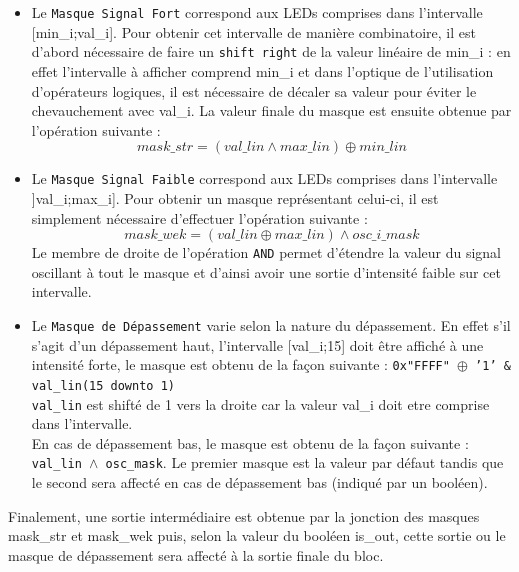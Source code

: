 \begin{itemize}
\item Le \texttt{Masque Signal Fort} correspond aux LEDs comprises dans l'intervalle [min\_i;val\_i]. Pour obtenir cet intervalle de manière combinatoire, il est d'abord nécessaire de faire un \texttt{shift right} de la valeur linéaire de min\_i : en effet l'intervalle à afficher comprend min\_i et dans l'optique de l'utilisation d'opérateurs logiques, il est nécessaire de décaler sa valeur pour éviter le chevauchement avec val\_i. La valeur finale du masque est ensuite obtenue par l'opération suivante :
\begin{equation*}
 mask\_str = (val\_lin \land max\_lin) \oplus min\_lin
\end{equation*}

\item Le \texttt{Masque Signal Faible} correspond aux LEDs comprises dans l'intervalle ]val\_i;max\_i]. Pour obtenir un masque représentant celui-ci, il est simplement nécessaire d'effectuer l'opération suivante :
\begin{equation*}
mask\_wek = (val\_lin \oplus max\_lin ) \land osc\_i\_mask
\end{equation*}
Le membre de droite de l'opération \texttt{AND} permet d'étendre la valeur du signal oscillant à tout le masque et d'ainsi avoir une sortie d'intensité faible sur cet intervalle.

\item Le \texttt{Masque de Dépassement} varie selon la nature du dépassement. En effet s'il s'agit d'un dépassement haut, l'intervalle [val\_i;15] doit être affiché à une intensité forte, le masque est obtenu de la façon suivante : 
 \texttt{0x"FFFF" $\oplus$ '1' \& val\_lin(15 downto 1)} \\
 \texttt{val\_lin} est shifté de 1 vers la droite car la valeur val\_i doit etre comprise dans l'intervalle. \\
 En cas de dépassement bas, le masque est obtenu de la façon suivante : \texttt{val\_lin $\land$ osc\_mask}. Le premier masque est la valeur par défaut tandis que le second sera affecté en cas de dépassement bas (indiqué par un booléen).
\end{itemize}
Finalement, une sortie intermédiaire est obtenue par la jonction des masques mask\_str et mask\_wek puis, selon la valeur du booléen is\_out, cette sortie ou le masque de dépassement sera affecté à la sortie finale du bloc.

